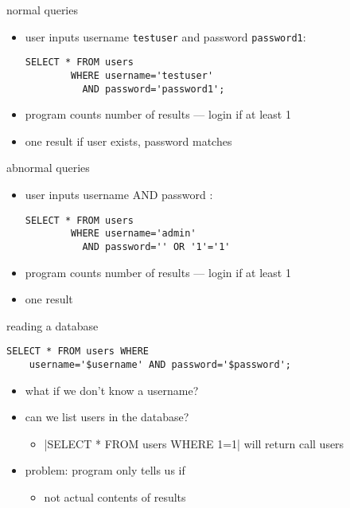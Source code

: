 \begin{frame}[fragile,label=normQuery]{normal queries}
    \begin{itemize}
    \item user inputs username \texttt{testuser} and password \texttt{password1}:
\begin{verbatim}
SELECT * FROM users
        WHERE username='testuser'
          AND password='password1';
\end{verbatim}
    \item program counts number of results --- login if at least 1
    \item one result if user exists, password matches
    \end{itemize}
\end{frame}

\begin{frame}[fragile,label=abnormalQ]{abnormal queries}
    \begin{itemize}
        \item user inputs username  AND password :
\begin{verbatim}
SELECT * FROM users
        WHERE username='admin'
          AND password='' OR '1'='1'
\end{verbatim}
    \item program counts number of results --- login if at least 1
    \item one result 
    \end{itemize}
\end{frame}

\begin{frame}[fragile,label=readDB]{reading a database}
\begin{verbatim}
SELECT * FROM users WHERE
    username='$username' AND password='$password';
\end{verbatim}
    \begin{itemize}
    \item what if we don't know a username?
    \item can we list users in the database?
        \begin{itemize}
        \item \SQLinline|SELECT * FROM users WHERE 1=1| will return call users
        \end{itemize}
    \item<2> problem: program only tells us if 
        \begin{itemize}
        \item not actual contents of results
        \end{itemize}
    \end{itemize}
\end{frame}

